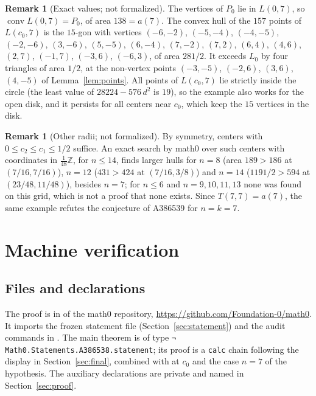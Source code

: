 \documentclass[11pt]{amsart}
\theoremstyle{plain}
\theoremstyle{definition}
\newtheorem{remark}[theorem]{Remark}
\newcommand{\Z}{\mathbb{Z}}
\DeclareMathOperator{\conv}{conv}
\begin{document}
\begin{remark}[Exact values; not formalized]\label{rem:exact}
The vertices of $P_0$ lie in $L(0,7)$, so $\conv L(0,7)=P_0$, of area $138=a(7)$. The convex hull of the $157$ points of $L(c_0,7)$ is the $15$-gon with vertices
$(-6,-2)$, $(-5,-4)$, $(-4,-5)$, $(-2,-6)$, $(3,-6)$, $(5,-5)$, $(6,-4)$, $(7,-2)$, $(7,2)$, $(6,4)$, $(4,6)$, $(2,7)$, $(-1,7)$, $(-3,6)$, $(-6,3)$,
of area $281/2$. It exceeds $L_0$ by four triangles of area $1/2$, at the non-vertex points $(-3,-5)$, $(-2,6)$, $(3,6)$, $(4,-5)$ of Lemma~\ref{lem:points}. All points of $L(c_0,7)$ lie strictly inside the circle (the least value of $28224-576\,d^2$ is $19$), so the example also works for the open disk, and it persists for all centers near $c_0$, which keep the $15$ vertices in the disk.
\end{remark}

\begin{remark}[Other radii; not formalized]\label{rem:more}
By symmetry, centers with $0\le c_2\le c_1\le 1/2$ suffice. An exact search by math0 over such centers with coordinates in $\frac1{48}\Z$, for $n\le14$, finds larger hulls for $n=8$ (area $189>186$ at $(7/16,7/16)$), $n=12$ ($431>424$ at $(7/16,3/8)$) and $n=14$ ($1191/2>594$ at $(23/48,11/48)$), besides $n=7$; for $n\le6$ and $n=9,10,11,13$ none was found on this grid, which is not a proof that none exists. Since $T(7,7)=a(7)$, the same example refutes the conjecture of A386539 for $n=k=7$.
\end{remark}

\section{Machine verification}\label{sec:lean}

\subsection*{Files and declarations}
The proof is in  of the math0 repository, \url{https://github.com/Foundation-0/math0}. It imports the frozen statement file (Section~\ref{sec:statement}) and the audit commands in . The main theorem is  of type \texttt{¬ Math0.Statements.A386538.statement}; its proof is a \texttt{calc} chain following the display in Section~\ref{sec:final}, combined with  at $c_0$ and the case $n=7$ of the hypothesis. The auxiliary declarations are private and named in Section~\ref{sec:proof}.
\end{document}
